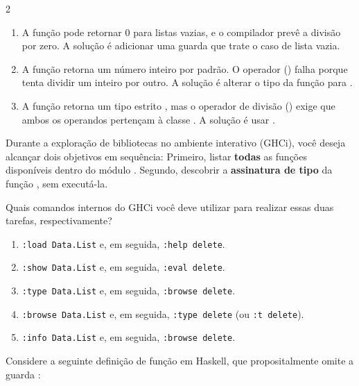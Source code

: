 \documentclass[a4paper,10pt,brazil]{article}
\begin{document}
\begin{multicols}{2}
\begin{enumerate}
  \item A função  pode retornar 0 para listas vazias, e o compilador prevê a divisão por zero. A solução é adicionar uma guarda que trate o caso de lista vazia.

  \item A função  retorna um número inteiro por padrão. O operador (\haskellinline{/}) falha porque tenta dividir um inteiro por outro. A solução é alterar o tipo da função para .

  \item A função  retorna um tipo estrito , mas o operador de divisão (\haskellinline{/}) exige que ambos os operandos pertençam à classe . A solução é usar .


\end{enumerate}

Durante a exploração de bibliotecas no ambiente interativo (GHCi), você deseja alcançar dois objetivos em sequência:
Primeiro, listar \textbf{todas} as funções disponíveis dentro do módulo .
Segundo, descobrir a \textbf{assinatura de tipo} da função , sem executá-la.

Quais comandos internos do GHCi você deve utilizar para realizar essas duas tarefas, respectivamente?

\begin{enumerate}
  \item \texttt{:load Data.List} e, em seguida, \texttt{:help delete}.

  \item \texttt{:show Data.List} e, em seguida, \texttt{:eval delete}.

  \item \texttt{:type Data.List} e, em seguida, \texttt{:browse delete}.

  \item \texttt{:browse Data.List} e, em seguida, \texttt{:type delete} (ou \texttt{:t delete}).

  \item \texttt{:info Data.List} e, em seguida, \texttt{:browse delete}.


\end{enumerate}

Considere a seguinte definição de função em Haskell, que propositalmente omite a guarda :


\end{multicols}
\end{document}
